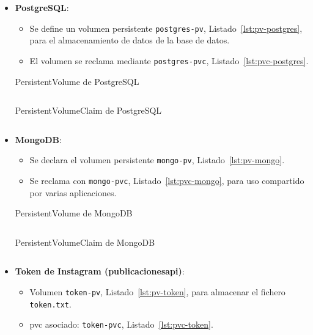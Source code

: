 \begin{itemize}
  \item \textbf{PostgreSQL}:
  \begin{itemize}
    \item Se define un volumen persistente \texttt{postgres-pv}, Listado~\ref{lst:pv-postgres}, para el almacenamiento de datos de la base de datos.
    \item El volumen se reclama mediante \texttt{postgres-pvc}, Listado~\ref{lst:pvc-postgres}.
  \end{itemize}

  \begin{longlisting}
  \caption{PersistentVolume de PostgreSQL}
  \inputminted[firstline=5,lastline=15]{yaml}{../backend/despliegue/kubernetes/despliegue.yaml}
  \label{lst:pv-postgres}
  \end{longlisting}

  \begin{longlisting}
  \caption{PersistentVolumeClaim de PostgreSQL}
  \inputminted[firstline=17,lastline=26]{yaml}{../backend/despliegue/kubernetes/despliegue.yaml}
  \label{lst:pvc-postgres}
  \end{longlisting}

  \item \textbf{MongoDB}:
  \begin{itemize}
    \item Se declara el volumen persistente \texttt{mongo-pv}, Listado~\ref{lst:pv-mongo}.
    \item Se reclama con \texttt{mongo-pvc}, Listado~\ref{lst:pvc-mongo}, para uso compartido por varias aplicaciones.
  \end{itemize}

  \begin{longlisting}
  \caption{PersistentVolume de MongoDB}
  \inputminted[firstline=30,lastline=40]{yaml}{../backend/despliegue/kubernetes/despliegue.yaml}
  \label{lst:pv-mongo}
  \end{longlisting}

  \begin{longlisting}
  \caption{PersistentVolumeClaim de MongoDB}
  \inputminted[firstline=42,lastline=51]{yaml}{../backend/despliegue/kubernetes/despliegue.yaml}
  \label{lst:pvc-mongo}
  \end{longlisting}

  \item \textbf{Token de Instagram (publicacionesapi)}:
  \begin{itemize}
    \item Volumen \texttt{token-pv}, Listado~\ref{lst:pv-token}, para almacenar el fichero \texttt{token.txt}.
    \item \gls{pvc} asociado: \texttt{token-pvc}, Listado~\ref{lst:pvc-token}.
  \end{itemize}


\end{itemize}
